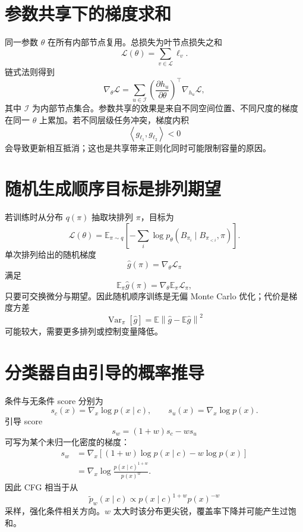 \documentclass[UTF8,12pt,a4paper,fontset=none]{ctexart}
\numberwithin{equation}{section}
\newcommand{\E}{\mathbb{E}}
\newcommand{\Loss}{\mathcal{L}}
\newcommand{\norm}[1]{\left\lVert #1\right\rVert}
\newcommand{\ip}[2]{\left\langle #1,#2\right\rangle}
\begin{document}
\section{参数共享下的梯度求和}
同一参数 $\theta$ 在所有内部节点复用。总损失为叶节点损失之和
\begin{equation}
 \Loss(\theta)=\sum_{v\in\mathcal L}\ell_v.
\end{equation}
链式法则得到
\begin{equation}
 \nabla_\theta\Loss
 =\sum_{u\in\mathcal I}
 \left(\frac{\partial h_u}{\partial\theta}\right)^\top
 \nabla_{h_u}\Loss,
\end{equation}
其中 $\mathcal I$ 为内部节点集合。参数共享的效果是来自不同空间位置、不同尺度的梯度在同一 $\theta$ 上累加。若不同层级任务冲突，梯度内积
\begin{equation}
 \ip{g_{\ell_1}}{g_{\ell_2}}<0
\end{equation}
会导致更新相互抵消；这也是共享带来正则化同时可能限制容量的原因。

\section{随机生成顺序目标是排列期望}
若训练时从分布 $q(\pi)$ 抽取块排列 $\pi$，目标为
\begin{equation}
 \Loss(\theta)
 =\E_{\pi\sim q}\left[-\sum_i
 \log p_\theta(B_{\pi_i}\mid B_{\pi_{<i}},\pi)\right].
\end{equation}
单次排列给出的随机梯度
\begin{equation}
 \widehat g(\pi)=\nabla_\theta\Loss_\pi
\end{equation}
满足
\begin{equation}
 \E_\pi\widehat g(\pi)=\nabla_\theta\E_\pi\Loss_\pi,
\end{equation}
只要可交换微分与期望。因此随机顺序训练是无偏 Monte Carlo 优化；代价是梯度方差
\begin{equation}
 \operatorname{Var}_\pi[\widehat g]
 =\E\norm{\widehat g-\E\widehat g}^2
\end{equation}
可能较大，需要更多排列或控制变量降低。

\section{分类器自由引导的概率推导}
条件与无条件 score 分别为
\begin{equation}
 s_c(x)=\nabla_x\log p(x\mid c),\qquad
 s_u(x)=\nabla_x\log p(x).
\end{equation}
引导 score
\begin{equation}
 s_w=(1+w)s_c-ws_u
\end{equation}
可写为某个未归一化密度的梯度：
\begin{align}
 s_w
 &=\nabla_x[(1+w)\log p(x\mid c)-w\log p(x)]\\
 &=\nabla_x\log\frac{p(x\mid c)^{1+w}}{p(x)^w}.
\end{align}
因此 CFG 相当于从
\begin{equation}
 \widetilde p_w(x\mid c)\propto
 p(x\mid c)^{1+w}p(x)^{-w}
\end{equation}
采样，强化条件相关方向。$w$ 太大时该分布更尖锐，覆盖率下降并可能产生过饱和。
\clearpage
\end{document}
